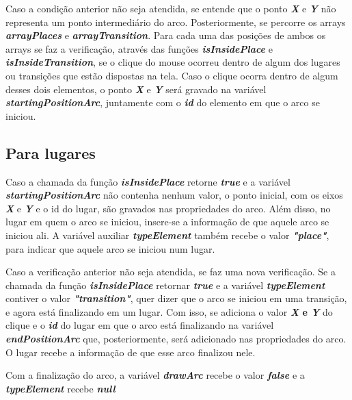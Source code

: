 \documentclass[
	12pt,				%
	openright,			%
	oneside,			%
	a4paper,			%
	english,			%
	brazil				%
	]{abntex2}
\begin{document}


Caso a condição anterior não seja atendida, se entende que o ponto \textbf{\textit{X}} e \textbf{\textit{Y}} não representa um ponto intermediário do arco. Posteriormente, se percorre os arrays \textbf{\textit{arrayPlaces}} e \textbf{\textit{arrayTransition}}. Para cada uma das posições de ambos os arrays se faz a verificação, através das funções \textbf{\textit{isInsidePlace}} e \textbf{\textit{isInsideTransition}}, se o clique do mouse ocorreu dentro de algum dos lugares ou transições que estão dispostas na tela. Caso o clique ocorra dentro de algum desses dois elementos, o ponto \textbf{\textit{X}} e \textbf{\textit{Y}} será gravado na variável \textbf{\textit{startingPositionArc}}, juntamente com o \textbf{\textit{id}} do elemento em que o arco se iniciou. 

\subsection*{Para lugares}

Caso a chamada da função \textbf{\textit{isInsidePlace}} retorne \textbf{\textit{true}} e a variável \textbf{\textit{startingPositionArc}} não contenha nenhum valor, o ponto inicial, com os eixos \textbf{\textit{X}} e \textbf{\textit{Y}} e o id do lugar, são gravados nas propriedades do arco. Além disso, no lugar em quem o arco se iniciou, insere-se a informação de que aquele arco se iniciou ali. A variável auxiliar \textbf{\textit{typeElement}} também recebe o valor \textbf{\textit{"place"}}, para indicar que aquele arco se iniciou num lugar. 

Caso a verificação anterior não seja atendida, se faz uma nova verificação. Se a chamada da função \textbf{\textit{isInsidePlace}} retornar \textbf{\textit{true}} e a variável \textbf{\textit{typeElement}} contiver o valor \textbf{\textit{"transition"}}, quer dizer que o arco se iniciou em uma transição, e agora está finalizando em um lugar. Com isso, se adiciona o valor \textbf{\textit{X} e \textbf{\textit{Y}}} do clique e o \textbf{\textit{id}} do lugar em que o arco está finalizando na variável \textbf{\textit{endPositionArc}} que, posteriormente, será adicionado nas propriedades do arco. O lugar recebe a informação de que esse arco finalizou nele.

Com a finalização do arco, a variável \textbf{\textit{drawArc}} recebe o valor \textbf{\textit{false}} e a \textbf{\textit{typeElement}} recebe \textbf{\textit{null}}
\end{document}

